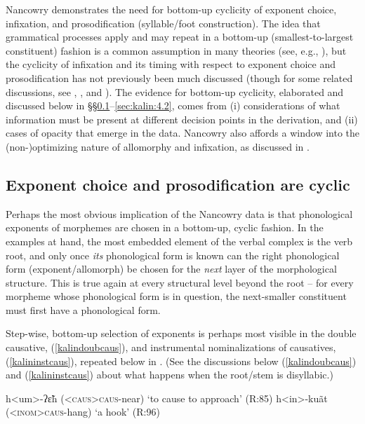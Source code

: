 \documentclass[output=paper]{langscibook}
\begin{document}
Nancowry demonstrates the need for bottom-up cyclicity of exponent choice, infixation, and prosodification (syllable/foot construction). The idea that grammatical processes apply and may repeat in a bottom-up (smallest-to-largest constituent) fashion is a common assumption in many theories (see, e.g., \citealt{ChomskyHalle68,Kiparsky82,Kiparsky00,Carstairs87,Anderson92,Bobaljik00,Wolf08,Embick10,BS12}), but the cyclicity of infixation and its timing with respect to exponent choice and prosodification has not previously been  much discussed (though for some related discussions, see  \citealt[\S3.4.3]{Embick10}, \citealt{BF16}, and \citealt{Harizanov17}). The evidence for bottom-up cyclicity, elaborated and discussed below in \S\S\ref{sec:kalin:4.1}--\ref{sec:kalin:4.2}, comes from (i) considerations of what information must be present at different decision points in the derivation, and (ii) cases of opacity that emerge in the data. Nancowry also affords a window into the (non-)optimizing nature of allomorphy and infixation, as discussed in .

\subsection{Exponent choice and prosodification are cyclic}\label{sec:kalin:4.1}

Perhaps the most obvious implication of the Nancowry data is that phonological exponents of morphemes are chosen in a bottom-up, cyclic fashion. In the examples at hand, the most embedded element of the verbal complex is the verb root, and only once \textit{its} phonological form is known can the right phonological form (exponent/allomorph) be chosen for the \textit{next} layer of the morphological structure. This is true again at every structural level beyond the root -- for every morpheme whose phonological form is in question, the next-smaller constituent must first have a phonological form. 

Step-wise, bottom-up selection of exponents is perhaps most visible in the double causative, (\ref{kalindoubcaus}), and instrumental nominalizations of causatives, (\ref{kalininstcaus}), repeated below in \Next. (See the  discussions below (\ref{kalindoubcaus}) and  (\ref{kalininstcaus}) about what happens when the root/stem is disyllabic.)

\ea \label{kalin16}
\ea h<um>-ʔ\~εh (\textsc{<caus>}\textsc{caus-}near) \hfill  `to cause to approach'  (R:85)\label{kalin16a}
\ex h<in>-ku\~at  (\textsc{<inom>}\textsc{caus-}hang) \hfill `a hook' (R:96) \label{kalin16b}
\z
\z
\end{document}
